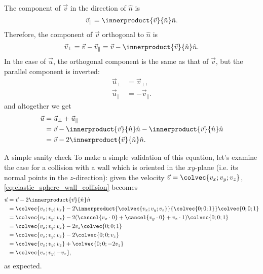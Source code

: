 The component of $\vec{v}$ in the direction of $\hat{n}$ is
\begin{equation}
	\vec{v}_{\parallel} = \innerproduct{\vec{v}}{\hat{n}}\hat{n}.
\end{equation}
Therefore, the component of $\vec{v}$ orthogonal to $\hat{n}$ is
\begin{equation}
	\vec{v}_{\perp} = \vec{v} - \vec{v}_{\parallel} = \vec{v} - \innerproduct{\vec{v}}{\hat{n}}\hat{n}.
\end{equation}
In the case of $\vec{u}$, the orthogonal component is the same as that of $\vec{v}$, but the parallel component is inverted:
\begin{equation}
	\begin{aligned}
		\vec{u}_{\perp}     & = \vec{v}_{\perp},      \\
		\vec{u}_{\parallel} & = -\vec{v}_{\parallel}.
	\end{aligned}
\end{equation}
and altogether we get
\begin{equation}
	\begin{aligned}
		\vec{u} & = \vec{u}_{\perp} + \vec{u}_{\parallel}                                                     \\
		        & = \vec{v} - \innerproduct{\vec{v}}{\hat{n}}\hat{n} - \innerproduct{\vec{v}}{\hat{n}}\hat{n} \\
		        & = \vec{v}-2\innerproduct{\vec{v}}{\hat{n}}\hat{n}.
	\end{aligned}
	\label{eq:elastic_sphere_wall_collision}
\end{equation}

\begin{example}{A simple sanity check}{}
	To make a simple validation of this equation, let's examine the case for a collision with a wall which is oriented in the $xy$-plane (i.e. its normal points in the $z$-direction): given the velocity $\vec{v}=\colvec{v_{x};v_{y};v_{z}}$, \autoref{eq:elastic_sphere_wall_collision} becomes
	\begin{align*}
		\vec{u} & = \vec{v}-2\innerproduct{\vec{v}}{\hat{n}}\hat{n}                                                     \\
		        & = \colvec{v_{x};v_{y};v_{z}}-2\innerproduct{\colvec{v_{x};v_{y};v_{z}}}{\colvec{0;0;1}}\colvec{0;0;1} \\
		        & = \colvec{v_{x};v_{y};v_{z}}-2(\cancel{v_{x}\cdot0}+\cancel{v_{y}\cdot0}+v_{z}\cdot1)\colvec{0;0;1}   \\
		        & = \colvec{v_{x};v_{y};v_{z}}-2v_{z}\colvec{0;0;1}                                                     \\
		        & = \colvec{v_{x};v_{y};v_{z}}-2\colvec{0;0;v_{z}}                                                      \\
		        & =  \colvec{v_{x};v_{y};v_{z}}+\colvec{0;0;-2v_{z}}                                                    \\
		        & =  \colvec{v_{x};v_{y};-v_{z}},
	\end{align*}
	as expected.
\end{example}


